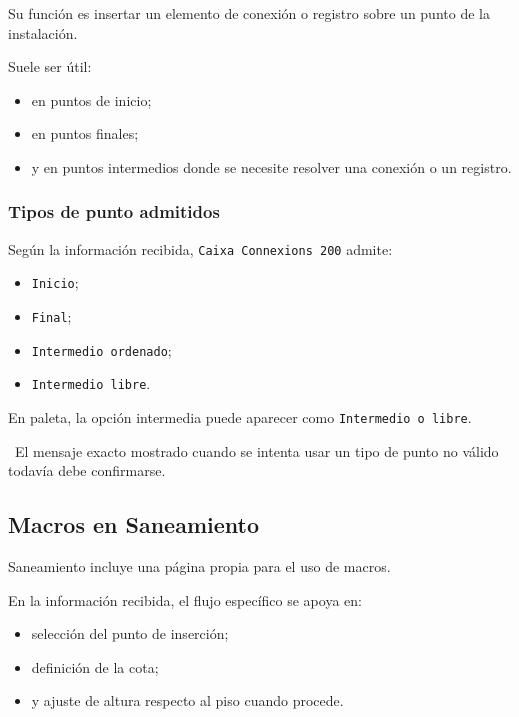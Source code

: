 Su función es insertar un elemento de conexión o registro sobre un punto de la instalación.

Suele ser útil:

\begin{itemize}
\item en puntos de inicio;
\item en puntos finales;
\item y en puntos intermedios donde se necesite resolver una conexión o un registro.
\end{itemize}


\subsubsection{Tipos de punto admitidos}

Según la información recibida, \texttt{Caixa Connexions 200} admite:

\begin{itemize}
\item \texttt{Inicio};
\item \texttt{Final};
\item \texttt{Intermedio ordenado};
\item \texttt{Intermedio libre}.
\end{itemize}

En paleta, la opción intermedia puede aparecer como \texttt{Intermedio o libre}.

\pendingtag\ El mensaje exacto mostrado cuando se intenta usar un tipo de punto no válido todavía debe confirmarse.

\subsection{Macros en Saneamiento}

Saneamiento incluye una página propia para el uso de macros.

En la información recibida, el flujo específico se apoya en:

\begin{itemize}
\item selección del punto de inserción;
\item definición de la cota;
\item y ajuste de altura respecto al piso cuando procede.
\end{itemize}

